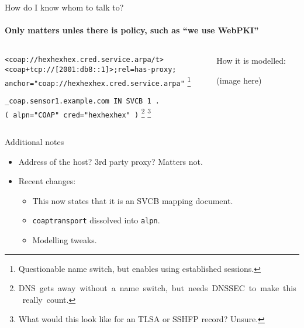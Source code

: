 \begin{frame}[fragile]{How do I know whom to talk to?}
    \framesubtitle{Only matters unles there is policy, such as ``we use WebPKI''}
    \begin{columns}
        \begin{column}{0.7\textwidth}
            \vspace{1cm}

\texttt{<coap://hexhexhex.cred.service.arpa/t>}\\
\texttt{<coap+tcp://[2001:db8::1]>;rel=has-proxy;}\\
\texttt{\qquad{}anchor="coap://hexhexhex.cred.service.arpa"}
            \footnote{Questionable name switch, but enables using established sessions.}
           
            \vspace{1cm}

\texttt{\_coap.sensor1.example.com IN SVCB 1 . \\}
\texttt{\qquad{}( alpn="COAP" cred="hexhexhex" )}
            \footnote{\mbox{DNS gets away without a name switch, but needs DNSSEC to make this really count.}}
            \footnote{What would this look like for an TLSA or SSHFP record? Unsure.}
            \vspace{1cm}
        \end{column}
        \begin{column}{0.3\textwidth}
            How it is modelled:
            
            (image here)
        \end{column}
    \end{columns}
\end{frame}

\begin{frame}{Additional notes}\large

    \begin{itemize}
        \item Address of the host? 3rd party proxy? Matters not.
            \bigskip
        \item  Recent changes:
        \begin{itemize}\Large
            \item This now states that it is an SVCB mapping document.
            \item \texttt{coaptransport} dissolved into \texttt{alpn}.
            \item Modelling tweaks.
        \end{itemize}
    \end{itemize}
\end{frame}


